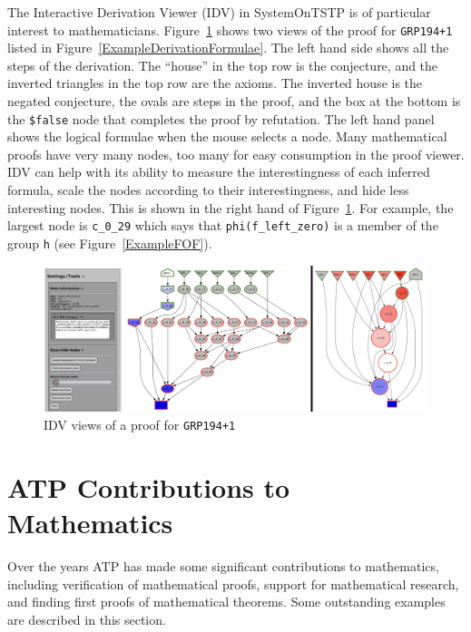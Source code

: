 \documentclass[runningheads]{llncs}
\begin{document}
The Interactive Derivation Viewer (IDV) in SystemOnTSTP is of particular interest to mathematicians.
Figure~\ref{IDV} shows two views of the proof for {\tt GRP194+1} listed in 
Figure~\ref{ExampleDerivationFormulae}.
The left hand side shows all the steps of the derivation.
The ``house'' in the top row is the conjecture, and the inverted triangles in the top row are the
axioms.
The inverted house is the negated conjecture, the ovals are steps in the proof, and the box at the
bottom is the {\tt \$false} node that completes the proof by refutation.
The left hand panel shows the logical formulae when the mouse selects a node.
Many mathematical proofs have very many nodes, too many for easy consumption in the proof viewer.
IDV can help with its ability to measure the interestingness of each inferred formula, scale the
nodes according to their interestingness, and hide less interesting nodes.
This is shown in the right hand of Figure~\ref{IDV}.
For example, the largest node is {\tt c\_0\_29} which says that {\tt phi(f\_left\_zero)} is a 
member of the group {\tt h} (see Figure~\ref{ExampleFOF}).

\begin{figure}[htb]
\centering
\includegraphics[width=1.0\textwidth]{IDV.pdf}
\vspace*{-1em}
\caption{IDV views of a proof for {\tt GRP194+1}}
\label{IDV}
\end{figure}

\section{ATP Contributions to Mathematics}
\label{Contributions}

Over the years ATP has made some significant contributions to mathematics, including verification
of mathematical proofs, support for mathematical research, and finding first proofs of mathematical
theorems.
Some outstanding examples are described in this section.
\end{document}
